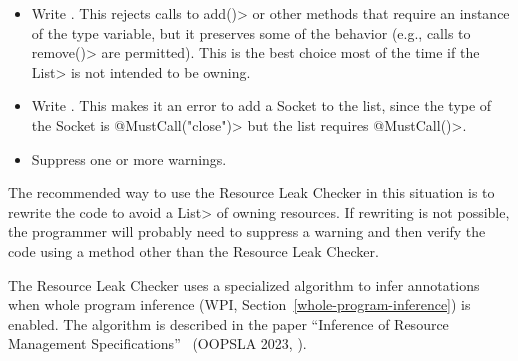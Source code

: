 \begin{itemize}
\item Write . This rejects calls to \<add()>
or other methods that require an instance of the type variable, but it
preserves some of the behavior (e.g., calls to \<remove()> are permitted).
This is the best choice most of the time if the \<List> is not intended to
be owning.
\item Write . This makes it an error to
add a Socket to the list, since the type of the Socket is
\<@MustCall("close")> but the list requires \<@MustCall()>.
\item Suppress one or more warnings.
\end{itemize}

The recommended way to use the Resource Leak Checker in this situation is
to rewrite the code to avoid a \<List> of owning resources. If rewriting is
not possible, the programmer will probably need to suppress a warning and
then verify the code using a method other than the Resource Leak Checker.



The Resource Leak Checker uses a specialized algorithm to infer annotations
when whole program inference (WPI, Section~\ref{whole-program-inference})
is enabled.  The algorithm is described in the paper ``Inference of
Resource Management Specifications''~\cite{ShadabGTEKLLS2023} (OOPSLA 2023,
).



